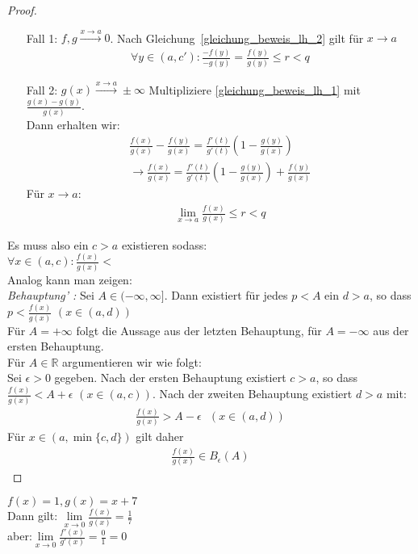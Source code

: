 \begin{proof}
	\begin{enumerate}[label=Fall {\arabic*}]
		\item[Fall 1:] $f,g \overset{x \rightarrow a}{\longrightarrow} 0$. 
		Nach Gleichung~\eqref{gleichung_beweis_lh_2}
		gilt für $x \rightarrow a$ 
		\begin{align*}
			\forall y \in (a, c') : \frac{-f(y)}{-g(y)} = \frac{f(y)}{g(y)} \leq r <q
		\end{align*}
		\item[Fall 2:] $g(x) \overset{x \rightarrow a}{\rightarrow}\pm \infty$
		Multipliziere \eqref{gleichung_beweis_lh_1} mit
		$\frac{g(x)-g(y)}{g(x)}$. \\
		Dann erhalten wir:
		\begin{align*}
			\frac{f(x)}{g(x)} - \frac{f(y)}{g(x)} = \frac{f'(t)}{g'(t)}
			\left( 1 - \frac{g(y)}{g(x)}\right) \\
			 \rightarrow \frac{f(x)}{g(x)} = \frac{f'(t)}{g'(t)} \left(
			1- \frac{g(y)}{g(x)}\right) + \frac{f(y)}{g(x)}
		\end{align*}
		Für $x \rightarrow a$:
		\begin{align*}
			\lim\limits_{x\rightarrow a}{\frac{f(x)}{g(x)}}\leq r < q
		\end{align*}
	\end{enumerate}
		Es muss also ein $ c > a$ existieren sodass:\\ 
		$\forall x \in (a,c): \frac{f(x)}{g(x)} <$\\
		Analog kann man zeigen: \\
		\emph{Behauptung' :} Sei $A  \in (-\infty, \infty]$. Dann existiert für 
		jedes $p <A$ ein $d > a$, so dass $p < \frac{f(x)}{g(x)}$ $(x \in (a,d))$\\
		Für $A = +\infty$ folgt die Aussage aus der letzten Behauptung, für 
		$ A = - \infty$ aus der ersten Behauptung. \\
		Für $A \in \mathbb{R}$ argumentieren wir wie folgt: \\
		Sei $\epsilon > 0$ gegeben. Nach der ersten Behauptung existiert 
		$c > a$, so dass \\$\frac{f(x)}{g(x)} < A + \epsilon$ $(x\in (a,c))$. 
		Nach der zweiten Behauptung existiert $d > a$ mit:
		\begin{align*}
			\frac{f(x)}{g(x)} > A - \epsilon \text{ } (x \in (a,d))
		\end{align*}
		Für $x \in (a, \min\{c,d\})$ gilt daher
		\begin{align*}
			\frac{f(x)}{g(x)} \in B_{\epsilon}(A)
		\end{align*}
\end{proof}

\begin{Beispiel}{
	$f(x) = 1, g(x) = x + 7$\\
	Dann gilt: $\lim\limits_{x \rightarrow 0 }{\frac{f(x)}{g(x)} = \frac{1}{7}}$ \\
 aber:$ \lim\limits_{x \rightarrow 0 }{\frac{f'(x)}{g'(x)} = \frac{0}{	1}= 0}$
}\end{Beispiel}

